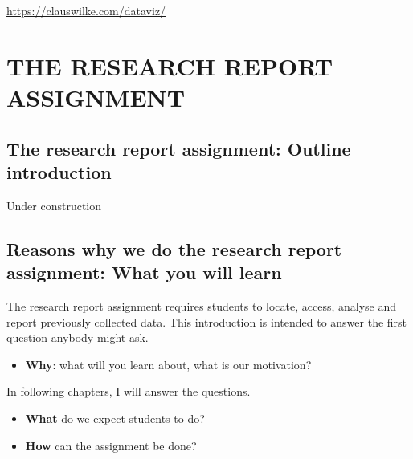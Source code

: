 \documentclass[
  letterpaper,
  DIV=11,
  numbers=noendperiod]{scrreprt}
\providecommand{\tightlist}{%
  \setlength{\itemsep}{0pt}\setlength{\parskip}{0pt}}\usepackage{longtable,booktabs,array}
\begin{document}
\url{https://clauswilke.com/dataviz/}

\part{THE RESEARCH REPORT ASSIGNMENT}


\hypertarget{sec-report-intro}{%
\chapter{The research report assignment: Outline
introduction}\label{sec-report-intro}}

\begin{tcolorbox}[enhanced jigsaw, opacitybacktitle=0.6, title=\textcolor{quarto-callout-warning-color}{\faExclamationTriangle}\hspace{0.5em}{Warning}, arc=.35mm, colbacktitle=quarto-callout-warning-color!10!white, colframe=quarto-callout-warning-color-frame, leftrule=.75mm, opacityback=0, breakable, titlerule=0mm, left=2mm, bottomrule=.15mm, toprule=.15mm, colback=white, coltitle=black, bottomtitle=1mm, toptitle=1mm, rightrule=.15mm]

Under construction

\end{tcolorbox}


\hypertarget{sec-intro-why}{%
\chapter{Reasons why we do the research report assignment: What you will
learn}\label{sec-intro-why}}

The research report assignment requires students to locate, access,
analyse and report previously collected data. This introduction is
intended to answer the first question anybody might ask.

\begin{itemize}
\tightlist
\item
  \textbf{Why}: what will you learn about, what is our motivation?
\end{itemize}

In following chapters, I will answer the questions.

\begin{itemize}
\tightlist
\item
  \textbf{What} do we expect students to do?
\item
  \textbf{How} can the assignment be done?
\end{itemize}
\end{document}
